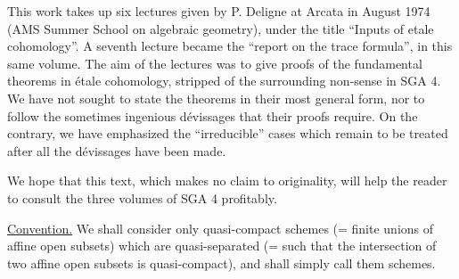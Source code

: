 This work takes up six lectures given by P. Deligne at Arcata in August 1974
(AMS Summer School on algebraic geometry), under the title ``Inputs of etale
cohomology''. A seventh lecture became the ``report on the trace formula'',
in this same volume. The aim of the lectures was to give proofs of the
fundamental theorems in étale cohomology, stripped of the surrounding
non-sense in SGA 4. We have not sought to state the theorems in their most
general form, nor to follow the sometimes ingenious dévissages that their
proofs require. On the contrary, we have emphasized the ``irreducible''
cases which remain to be treated after all the dévissages have been made.

We hope that this text, which makes no claim to originality, will help the
reader to consult the three volumes of SGA 4 profitably.

\medskip
\noindent\underline{Convention.} We shall consider only quasi-compact
schemes (= finite unions of affine open subsets) which are quasi-separated
(= such that the intersection of two affine open subsets is quasi-compact),
and shall simply call them schemes.

\newpage

